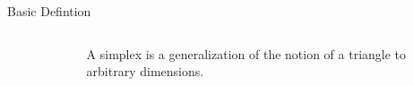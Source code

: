 \documentclass[10pt]{beamer}
\begin{document}
\begin{frame}{Basic Defintion}
\begin{columns}
	\begin{column}{0.2\textwidth} 
		\begin{figure}[h]
		\end{figure}
	\end{column}
	\begin{column}{0.8\textwidth}
		\alert{A simplex} is a generalization of the notion of a triangle to arbitrary dimensions.		
		\bigskip
	

\end{column}
\end{columns}
\end{frame}
\end{document}
